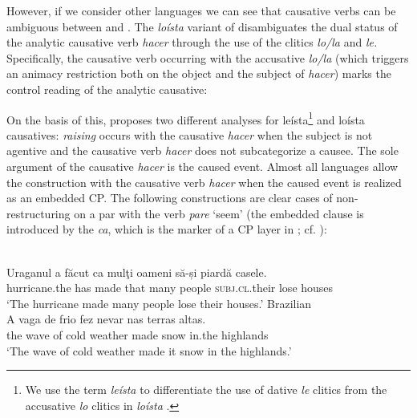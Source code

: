 \documentclass[output=paper]{langsci/langscibook}
\begin{document}
However, if we consider other languages we can see that causative verbs can be ambiguous between  and . The \textit{loísta} variant of  disambiguates the dual status of the analytic causative verb \textit{hacer} through the use of the clitics \textit{lo\slash la} and \textit{le.} Specifically, the causative verb occurring with the accusative \textit{lo\slash la} (which triggers an animacy restriction both on the object and the subject of \textit{hacer}) marks the control reading of the analytic causative:

\ea%
    \label{ex:moreno:7}
    \z
\z


On the basis of this, \citet{Torrego2010} proposes two different analyses for leísta\footnote{We use the term \textit{leísta} to differentiate the use of dative \textit{le} clitics from the accusative \textit{lo} clitics in \textit{loísta} .} and loísta causatives: \textit{raising} occurs with the causative \textit{hacer} when the subject is not agentive and the causative verb \textit{hacer} does not subcategorize a causee. The sole argument of the causative \textit{hacer} is the caused event. Almost all  languages allow the  construction with the causative verb \textit{hacer} when the caused event is realized as an embedded CP. The following constructions are clear cases of non-restructuring  on a par with the verb \textit{pare} ‘seem’ (the embedded clause is introduced by the  \textit{ca}, which is the marker of a CP layer in ; cf. \citealt{Alboiu2007}):

\ea%
    \label{ex:moreno:8}
    \ea  {}\\
    \gll Uraganul    a    făcut   ca   mulţi  oameni  să-și              piardă casele.   \\
         hurricane.the has made  that many people   \textsc{subj.cl}.their lose     houses \\
    \glt ‘The hurricane made many people lose their houses.’
    \ex  Brazilian \\
    \gll A   vaga  de frio     fez   nevar   nas     terras altas.  \\
         the wave of cold weather   made  snow  in.the highlands\\
    \glt ‘The wave of cold weather made it snow in the highlands.’ 
    \z
\z
\end{document}
